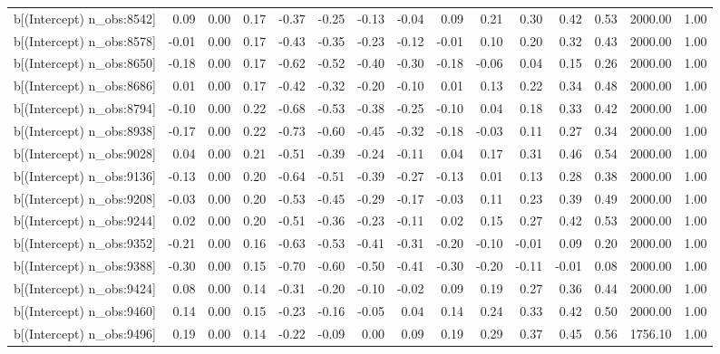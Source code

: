 \begin{table}[ht]
\begin{tabular}{rrrrrrrrrrrrrrr}
  b[(Intercept) n\_obs:8542] & 0.09 & 0.00 & 0.17 & -0.37 & -0.25 & -0.13 & -0.04 & 0.09 & 0.21 & 0.30 & 0.42 & 0.53 & 2000.00 & 1.00 \\ 
  b[(Intercept) n\_obs:8578] & -0.01 & 0.00 & 0.17 & -0.43 & -0.35 & -0.23 & -0.12 & -0.01 & 0.10 & 0.20 & 0.32 & 0.43 & 2000.00 & 1.00 \\ 
  b[(Intercept) n\_obs:8650] & -0.18 & 0.00 & 0.17 & -0.62 & -0.52 & -0.40 & -0.30 & -0.18 & -0.06 & 0.04 & 0.15 & 0.26 & 2000.00 & 1.00 \\ 
  b[(Intercept) n\_obs:8686] & 0.01 & 0.00 & 0.17 & -0.42 & -0.32 & -0.20 & -0.10 & 0.01 & 0.13 & 0.22 & 0.34 & 0.48 & 2000.00 & 1.00 \\ 
  b[(Intercept) n\_obs:8794] & -0.10 & 0.00 & 0.22 & -0.68 & -0.53 & -0.38 & -0.25 & -0.10 & 0.04 & 0.18 & 0.33 & 0.42 & 2000.00 & 1.00 \\ 
  b[(Intercept) n\_obs:8938] & -0.17 & 0.00 & 0.22 & -0.73 & -0.60 & -0.45 & -0.32 & -0.18 & -0.03 & 0.11 & 0.27 & 0.34 & 2000.00 & 1.00 \\ 
  b[(Intercept) n\_obs:9028] & 0.04 & 0.00 & 0.21 & -0.51 & -0.39 & -0.24 & -0.11 & 0.04 & 0.17 & 0.31 & 0.46 & 0.54 & 2000.00 & 1.00 \\ 
  b[(Intercept) n\_obs:9136] & -0.13 & 0.00 & 0.20 & -0.64 & -0.51 & -0.39 & -0.27 & -0.13 & 0.01 & 0.13 & 0.28 & 0.38 & 2000.00 & 1.00 \\ 
  b[(Intercept) n\_obs:9208] & -0.03 & 0.00 & 0.20 & -0.53 & -0.45 & -0.29 & -0.17 & -0.03 & 0.11 & 0.23 & 0.39 & 0.49 & 2000.00 & 1.00 \\ 
  b[(Intercept) n\_obs:9244] & 0.02 & 0.00 & 0.20 & -0.51 & -0.36 & -0.23 & -0.11 & 0.02 & 0.15 & 0.27 & 0.42 & 0.53 & 2000.00 & 1.00 \\ 
  b[(Intercept) n\_obs:9352] & -0.21 & 0.00 & 0.16 & -0.63 & -0.53 & -0.41 & -0.31 & -0.20 & -0.10 & -0.01 & 0.09 & 0.20 & 2000.00 & 1.00 \\ 
  b[(Intercept) n\_obs:9388] & -0.30 & 0.00 & 0.15 & -0.70 & -0.60 & -0.50 & -0.41 & -0.30 & -0.20 & -0.11 & -0.01 & 0.08 & 2000.00 & 1.00 \\ 
  b[(Intercept) n\_obs:9424] & 0.08 & 0.00 & 0.14 & -0.31 & -0.20 & -0.10 & -0.02 & 0.09 & 0.19 & 0.27 & 0.36 & 0.44 & 2000.00 & 1.00 \\ 
  b[(Intercept) n\_obs:9460] & 0.14 & 0.00 & 0.15 & -0.23 & -0.16 & -0.05 & 0.04 & 0.14 & 0.24 & 0.33 & 0.42 & 0.50 & 2000.00 & 1.00 \\ 
  b[(Intercept) n\_obs:9496] & 0.19 & 0.00 & 0.14 & -0.22 & -0.09 & 0.00 & 0.09 & 0.19 & 0.29 & 0.37 & 0.45 & 0.56 & 1756.10 & 1.00 \\ 

\end{tabular}
\end{table}
